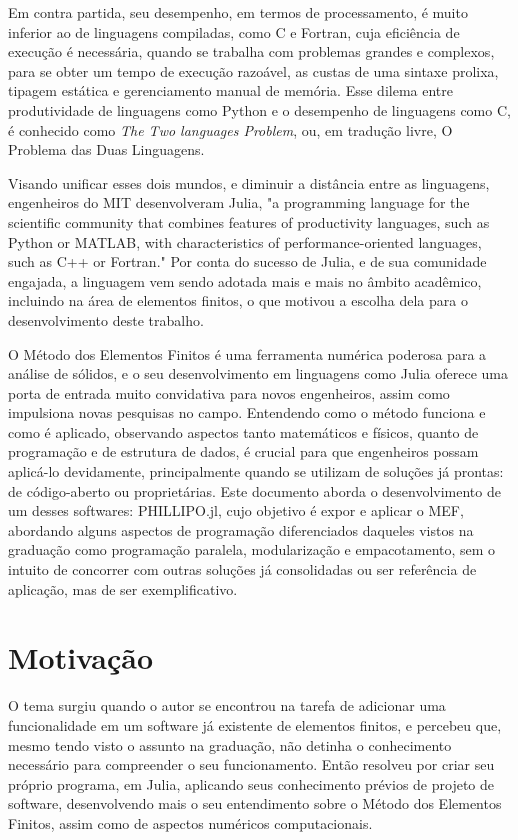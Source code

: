 Em contra partida, seu desempenho, em termos de processamento, é muito inferior ao de linguagens compiladas, como C e Fortran, cuja eficiência de execução é necessária, quando se trabalha com problemas grandes e complexos, para se obter um tempo de execução razoável, as custas de uma sintaxe prolixa, tipagem estática e gerenciamento manual de memória. Esse dilema entre produtividade de linguagens como Python e o desempenho de linguagens como C, é conhecido como \emph{The Two languages Problem}, ou, em tradução livre, O Problema das Duas Linguagens.

Visando unificar esses dois mundos, e diminuir a distância entre as linguagens, engenheiros do MIT desenvolveram Julia, "a programming language for the scientific community that combines features of productivity languages, such as Python or MATLAB, with characteristics of performance-oriented languages, such as C++ or Fortran." \cite[tradução livre]{Bezanson} Por conta do sucesso de Julia, e de sua comunidade engajada, a linguagem vem sendo adotada mais e mais no âmbito acadêmico, incluindo na área de elementos finitos, o que motivou a escolha dela para o desenvolvimento deste trabalho.

O Método dos Elementos Finitos é uma ferramenta numérica poderosa para a análise de sólidos, e o seu desenvolvimento em linguagens como Julia oferece uma porta de entrada muito convidativa para novos engenheiros, assim como impulsiona novas pesquisas no campo. Entendendo como o método funciona e como é aplicado, observando aspectos tanto matemáticos e físicos, quanto de programação e de estrutura de dados, é crucial para que engenheiros possam aplicá-lo devidamente, principalmente quando se utilizam de soluções já prontas: de código-aberto ou proprietárias. Este documento aborda o desenvolvimento de um desses softwares: PHILLIPO.jl, cujo objetivo é expor e aplicar o MEF, abordando alguns aspectos de programação diferenciados daqueles vistos na graduação como programação paralela, modularização e empacotamento, sem o intuito de concorrer com outras soluções já consolidadas ou ser referência de aplicação, mas de ser exemplificativo.

\section{Motivação}

O tema surgiu quando o autor se encontrou na tarefa de adicionar uma funcionalidade em um software já existente de elementos finitos, e percebeu que, mesmo tendo visto o assunto na graduação, não detinha o conhecimento necessário para compreender o seu funcionamento. Então resolveu por criar seu próprio programa, em Julia, aplicando seus conhecimento prévios de projeto de software, desenvolvendo mais o seu entendimento sobre o Método dos Elementos Finitos, assim como de aspectos numéricos computacionais.


